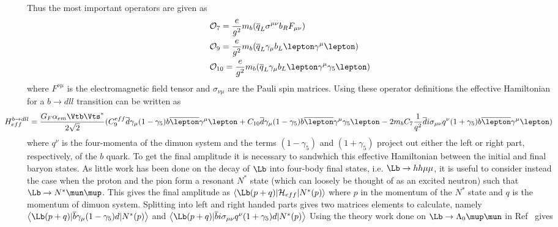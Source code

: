 Thus the most important operators are given as 
\begin{equation}
\begin{split}
&\mathcal{O}_{7} = \frac{e}{g^{2}}m_{b}(\overline{q}_{L}\sigma^{\mu\nu}b_{R}F_{\mu\nu})\\
&\mathcal{O}_{9} = \frac{e}{g^{2}}m_{b}(\overline{q}_{L}\gamma_{\mu}b_{L}\lepton\gamma^{\mu}\lepton)\\
&\mathcal{O}_{10} = \frac{e}{g^{2}}m_{b}(\overline{q}_{L}\gamma_{\mu}b_{L}\lepton\gamma^{\mu}\gamma_{5}\lepton)\\
\end{split}
\end{equation}
where $F^{\nu\mu}$ is the electromagnetic field tensor and $\sigma_{\nu\mu}$ are the Pauli spin matrices. Using these operator definitions the effective Hamiltonian for a $b\to dll$ transition can be written as
\begin{equation}
\hspace*{-1cm}
H^{b\to dll}_{eff} = \frac{G_{F}\alpha_{em}\Vtb\Vts^{*}}{2\sqrt{2}}(C_{9}^{eff}\overline{d}\gamma_{\mu}(1 - \gamma_{5})b\overline{\lepton}\gamma^{\mu}\lepton + C_{10}\overline{d}\gamma_{\mu}(1-\gamma_{5})b\overline{\lepton}\gamma^{\mu}\gamma_{5}\lepton - 2m_{b}C_{7}\frac{1}{q^{2}}\overline{d}i\sigma_{\mu\nu}q^{\nu}(1+\gamma_{5})b\overline{\lepton}\gamma^{\mu}\lepton)
\end{equation}
where $q^{\nu}$ is the four-momenta of the dimuon system and the terms $(1-\gamma_{5})$ and $(1+\gamma_{5})$ project out either the left or right part, respectively,  of the $b$ quark.
To get the final amplitude it is necessary to sandwhich this effective Hamiltonian between the initial and final baryon states. As little work has been done on the decay of $\Lb$ into four-body final states, i.e. $\Lb\to h h \mu\mu$, it is useful to consider instead the case when the proton and the pion form a resonant $N^{*}$ state (which can loosely be thought of as an excited neutron) such that $\Lb\to N^{*}\mun\mup$. This gives the final amplitude as $\left<\Lb(p+q)|\mathcal{H}_{eff}|N^{*}(p)\right>$ where $p$ in the momentum of the $N^{*}$ state and $q$ is the momentum of dimuon system. Splitting into left and right handed parts gives two matrices elements to calculate, namely $\left<\Lb(p+q)|\overline{b}\gamma_{\mu}(1-\gamma_{5})d|N^{*}(p)\right>$ and $\left<\Lb(p+q)|\overline{b}i\sigma_{\mu\nu}q^{\nu}(1+\gamma_{5})d|N^{*}(p)\right>$  Using the theory work done on $\Lb\to\Lambda_{0}\mup\mun$ in Ref~\cite{lbtolmumu} gives %
